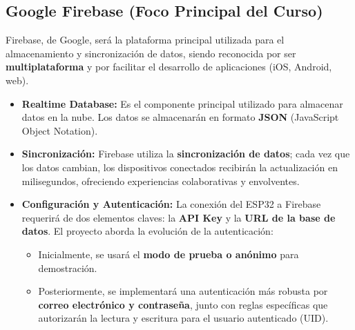 \documentclass{article}
\begin{document}
\subsection{Google Firebase (Foco Principal del Curso)}
Firebase, de Google, será la plataforma principal utilizada para el 
almacenamiento y sincronización de datos, siendo reconocida por ser 
\textbf{multiplataforma} y por facilitar el desarrollo de aplicaciones 
(iOS, Android, web).
\begin{itemize}
    \item \textbf{Realtime Database:} Es el componente principal 
    utilizado para almacenar datos en la nube. Los datos se almacenarán 
    en formato \textbf{JSON} (JavaScript Object Notation).
    \item \textbf{Sincronización:} Firebase utiliza la 
    \textbf{sincronización de datos}; cada vez que los datos cambian, 
    los dispositivos conectados recibirán la actualización en 
    milisegundos, ofreciendo experiencias colaborativas y envolventes.
    \item \textbf{Configuración y Autenticación:} La conexión del ESP32 
    a Firebase requerirá de dos elementos claves: la \textbf{API Key} y 
    la \textbf{URL de la base de datos}. El proyecto aborda la evolución 
    de la autenticación:
        \begin{itemize}
            \item Inicialmente, se usará el 
            \textbf{modo de prueba o anónimo} para demostración.
            \item Posteriormente, se implementará una autenticación más 
            robusta por \textbf{correo electrónico y contraseña}, junto 
            con reglas específicas que autorizarán la lectura y 
            escritura para el usuario autenticado (UID).
        \end{itemize}
\end{itemize}
\end{document}
